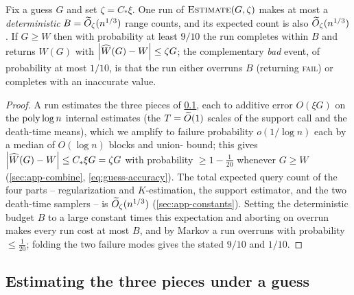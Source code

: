 \begin{lemma}\label{lem:percall}
Fix a guess $G$ and set $\zeta=C_*\xi$. One run of $\textsc{Estimate}(G,\zeta)$ makes at most a
\emph{deterministic} $B=\widetilde{O}_\zeta(n^{1/3})$ range counts, and its expected count is also
$\widetilde{O}_\zeta(n^{1/3})$. If $G\ge W$ then with probability at least $9/10$ the run completes within $B$ and
returns $\widehat W(G)$ with $\left|\widehat W(G)-W\right|\le\zeta G$; the complementary \emph{bad} event, of
probability at most $1/10$, is that the run either overruns $B$ (returning \textsc{fail}) or completes with
an inaccurate value.
\end{lemma}

\begin{proof}
A run estimates the three pieces of \cref{sec:main-pieces}, each to additive error $O(\xi G)$ on the
$\operatorname{poly}\log n$ internal estimates (the $T=\widetilde{O}(1)$ scales of the support call and the death-time means),
which we amplify to failure probability $o(1/\log n)$ each by a median of $O(\log n)$ blocks and union-
bound; this gives $\left|\widehat W(G)-W\right|\le C_*\xi G=\zeta G$ with probability $\ge 1-\tfrac1{20}$ whenever
$G\ge W$ (\cref{sec:app-combine}, \eqref{eq:guess-accuracy}). The total expected query count of the four
parts -- regularization and $K$-estimation, the support estimator, and the two death-time samplers -- is
$\widetilde{O}_\zeta(n^{1/3})$ (\cref{sec:app-constants}). Setting the deterministic budget $B$ to a large constant
times this expectation and aborting on overrun makes every run cost at most $B$, and by Markov a run
overruns with probability $\le\tfrac1{20}$; folding the two failure modes gives the stated $9/10$ and
$1/10$.
\end{proof}

\subsection{Estimating the three pieces under a guess}\label{sec:main-pieces}


